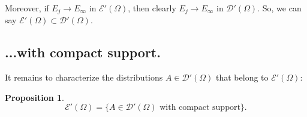 \documentclass[a4paper,9pt]{amsart}
\newcommand{\scr}[1]{\mathscr{#1}}
\theoremstyle{plain}
\newtheorem{proposition}{Proposition}[section]
\theoremstyle{definition}
\theoremstyle{remark}
\begin{document}
Moreover, if $E_j\to E_\infty$ in $\scr E'(\Omega)$, then clearly $E_j\to E_\infty$ in $\scr D'(\Omega)$.
So, we can say $\scr E'(\Omega)\subset\scr D'(\Omega)$.

\subsection{...with compact support.}\label{subs67eb9b5f}
It remains to characterize the distributions $A\in\scr D'(\Omega)$ that belong to $\scr E'(\Omega)$:

\begin{proposition}\label{prop67eb9ee1}
	\begin{equation}
		\scr E'(\Omega) = \{A\in\scr D'(\Omega)\text{ with compact support}\} .
	\end{equation}
\end{proposition}
\end{document}
